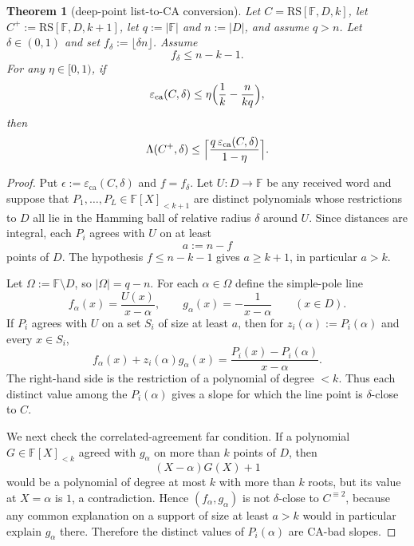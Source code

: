 \documentclass[11pt]{article}
\newtheorem{theorem}{Theorem}[section]
\theoremstyle{definition}
\theoremstyle{remark}
\newcommand{\F}{\mathbb{F}}
\newcommand{\RS}{\mathrm{RS}}
\newcommand{\eca}{\varepsilon_{\mathrm{ca}}}
\newcommand{\Lst}{\Lambda}
\begin{document}
\begin{theorem}[deep-point list-to-CA conversion]
\label{thm:A}
Let $C=\RS[\F,D,k]$, let $C^+:=\RS[\F,D,k+1]$, let
$q:=|\F|$ and $n:=|D|$, and assume $q>n$.  Let $\delta\in(0,1)$ and set
$f_\delta:=\lfloor \delta n\rfloor$.  Assume
\[
        f_\delta \le n-k-1 .
\]
For any $\eta\in[0,1)$, if
\[
        \eca(C,\delta)
        \le
        \eta\Bigl(\frac1k-\frac n{kq}\Bigr),
\]
then
\[
        \Lst(C^+,\delta)
        \le
        \Bigl\lceil
        \frac{q\,\eca(C,\delta)}{1-\eta}
        \Bigr\rceil .
\]
\end{theorem}

\begin{proof}
Put $\epsilon:=\eca(C,\delta)$ and $f=f_\delta$.
Let $U:D\to\F$ be any received word and suppose that
$P_1,\ldots,P_L\in\F[X]_{<k+1}$ are distinct polynomials whose
restrictions to $D$ all lie in the Hamming ball of relative radius
$\delta$ around $U$.  Since distances are integral, each $P_i$ agrees
with $U$ on at least
\[
        a:=n-f
\]
points of $D$.  The hypothesis $f\le n-k-1$ gives $a\ge k+1$, in particular
$a>k$.

Let $\Omega:=\F\setminus D$, so $|\Omega|=q-n$.  For each
$\alpha\in\Omega$ define the simple-pole line
\[
        f_\alpha(x)=\frac{U(x)}{x-\alpha},
        \qquad
        g_\alpha(x)=-\frac1{x-\alpha}
        \qquad (x\in D).
\]
If $P_i$ agrees with $U$ on a set $S_i$ of size at least $a$, then for
$z_i(\alpha):=P_i(\alpha)$ and every $x\in S_i$,
\[
        f_\alpha(x)+z_i(\alpha)g_\alpha(x)
        =\frac{P_i(x)-P_i(\alpha)}{x-\alpha}.
\]
The right-hand side is the restriction of a polynomial of degree $<k$.
Thus each distinct value among the $P_i(\alpha)$ gives a slope for
which the line point is $\delta$-close to $C$.

We next check the correlated-agreement far condition.  If a polynomial
$G\in\F[X]_{<k}$ agreed with $g_\alpha$ on more than $k$ points of $D$,
then
\[
        (X-\alpha)G(X)+1
\]
would be a polynomial of degree at most $k$ with more than $k$ roots,
but its value at $X=\alpha$ is $1$, a contradiction.  Hence
$(f_\alpha,g_\alpha)$ is not $\delta$-close to $C^{\equiv2}$, because
any common explanation on a support of size at least $a>k$ would in
particular explain $g_\alpha$ there.  Therefore the distinct values of
$P_i(\alpha)$ are CA-bad slopes.


\end{proof}
\end{document}
